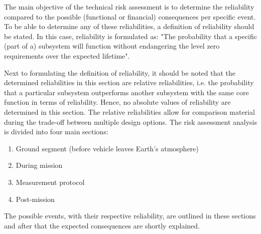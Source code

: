 The main objective of the technical risk assessment is to determine the reliability compared to the possible (functional or financial) consequences per specific event. To be able to determine any of these reliabilities, a definition of reliability should be stated. In this case, reliability is formulated as:
"The probability that a specific (part of a) subsystem will function without endangering the level zero requirements over the expected lifetime". 

Next to formulating the definition of reliability, it should be noted that the determined reliabilities in this section are relative reliabilities, i.e. the probability that a particular subsystem outperforms another subsystem with the same core function in terms of reliability. Hence, no absolute values of reliability are determined in this section. The relative reliabilities allow for comparison material during the trade-off between multiple design options. 
The risk assessment analysis is divided into four main sections: 
\begin{enumerate}[I]
	\item Ground segment (before vehicle leaves Earth's atmosphere)
	\item During mission
	\item Measurement protocol
	\item Post-mission
\end{enumerate}
The possible events, with their respective reliability, are outlined in these sections and after that the expected consequences are shortly explained. 

